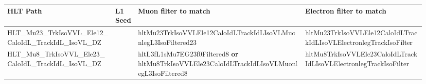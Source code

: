 {\footnotesize
\begin{tabular}{|p{2.5cm} p{2.5cm} p{4.5cm} p{4.5cm}|}
\hline
HLT Path & L1 Seed & Muon filter to match & Electron filter to match \\
\hline
HLT\_Mu23\_TrkIsoVVL\_Ele12\_CaloIdL\_TrackIdL\_IsoVL\_DZ
&
\TODO{???}
&
hltMu23TrkIsoVVLEle12CaloIdLTrackIdLIsoVLMuonlegL3IsoFiltered23
&
hltMu23TrkIsoVVLEle12CaloIdLTrackIdLIsoVLElectronlegTrackIsoFilter
\\
HLT\_Mu8\_TrkIsoVVL\_Ele23\_CaloIdL\_TrackIdL\_IsoVL\_DZ
&
\TODO{???}
&
hltL3fL1sMu7EG23f0Filtered8 \textbf{or} hltMu8TrkIsoVVLEle23CaloIdLTrackIdLIsoVLMuonlegL3IsoFiltered8
&
hltMu8TrkIsoVVLEle23CaloIdLTrackIdLIsoVLElectronlegTrackIsoFilter
\\
\hline
\end{tabular}
}
